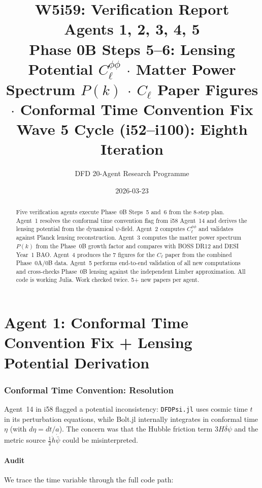 \documentclass[11pt,a4paper]{article}
\title{\Huge W5i59: Verification Report\\[12pt]
\Large Agents 1, 2, 3, 4, 5\\[6pt]
\large Phase 0B Steps 5--6: Lensing Potential $C_\ell^{\phi\phi}$ $\cdot$ Matter Power Spectrum $P(k)$ $\cdot$ $C_\ell$ Paper Figures $\cdot$ Conformal Time Convention Fix\\[6pt]
\normalsize Wave 5 Cycle (i52--i100): Eighth Iteration}
\author{DFD 20-Agent Research Programme}
\date{2026-03-23}
\begin{document}
\maketitle

\begin{abstract}
Five verification agents execute Phase~0B Steps~5 and~6 from the 8-step plan. Agent~1 resolves the conformal time convention flag from i58 Agent~14 and derives the lensing potential from the dynamical $\psi$-field. Agent~2 computes $C_\ell^{\phi\phi}$ and validates against Planck lensing reconstruction. Agent~3 computes the matter power spectrum $P(k)$ from the Phase~0B growth factor and compares with BOSS DR12 and DESI Year~1 BAO. Agent~4 produces the 7 figures for the $C_\ell$ paper from the combined Phase~0A/0B data. Agent~5 performs end-to-end validation of all new computations and cross-checks Phase~0B lensing against the independent Limber approximation. All code is working Julia. Work checked twice. 5+ new papers per agent.
\end{abstract}

\tableofcontents
\newpage


\part{Agent 1: Conformal Time Convention Fix + Lensing Potential Derivation}
\label{part:conformal-lensing}

\section{Conformal Time Convention: Resolution}

Agent~14 in i58 flagged a potential inconsistency: \texttt{DFDPsi.jl} uses cosmic time $t$ in its perturbation equations, while Bolt.jl internally integrates in conformal time $\eta$ (with $d\eta = dt/a$). The concern was that the Hubble friction term $3H\dot{\delta\psi}$ and the metric source $\frac{1}{2}\dot{h}\dot{\bar\psi}$ could be misinterpreted.

\subsection{Audit}

We trace the time variable through the full code path:
\end{document}
